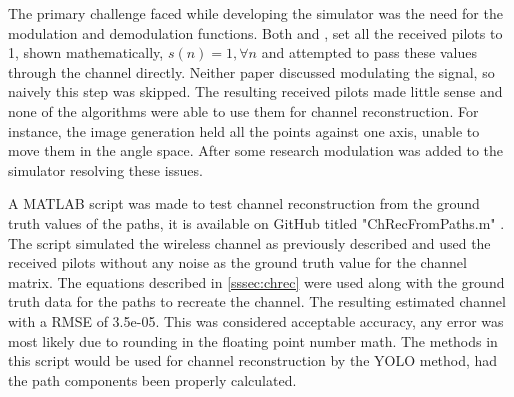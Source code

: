 The primary challenge faced while developing the simulator was the need for the modulation and demodulation functions. Both \cite{Li2020} and \cite{Han2019}, set all the received pilots to 1, shown mathematically, \(s(n) = 1, \forall n\) and attempted to pass these values through the channel directly. Neither paper discussed modulating the signal, so naively this step was skipped. The resulting received pilots made little sense and none of the algorithms were able to use them for channel reconstruction. For instance, the image generation held all the points against one axis, unable to move them in the angle space. After some research modulation was added to the simulator resolving these issues. 

A MATLAB script was made to test channel reconstruction from the ground truth values of the paths, it is available on GitHub titled "ChRecFromPaths.m" \cite{git}. The script simulated the wireless channel as previously described and used the received pilots without any noise as the ground truth value for the channel matrix. The equations described in \ref{sssec:chrec} were used along with the ground truth data for the paths to recreate the channel. The resulting estimated channel with a RMSE of 3.5e-05. This was considered acceptable accuracy, any error was most likely due to rounding in the floating point number math. The methods in this script would be used for channel reconstruction by the YOLO method, had the path components been properly calculated.